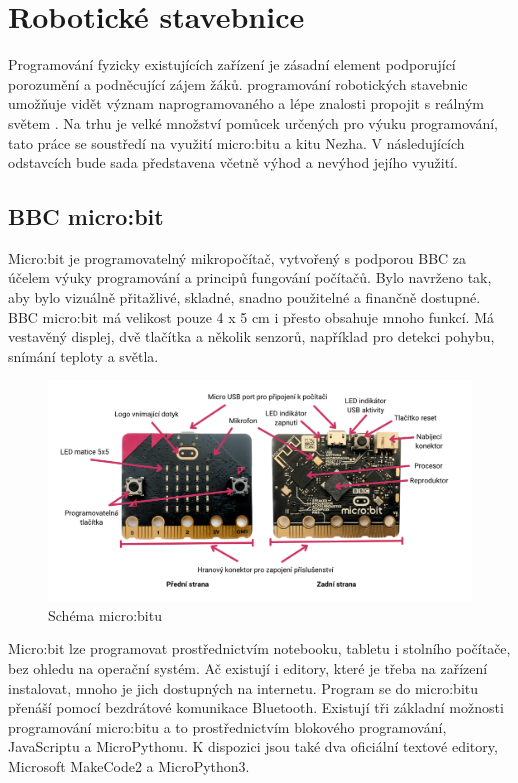 \documentclass[
  digital,     %
  oneside,     %
  nosansbold,  %
  colorbold, %
  lof,         %
  nolot,         %
]{fithesis4}
\begin{document}
\section{Robotické stavebnice}
Programování fyzicky existujících zařízení je zásadní element podporující porozumění a podněcující zájem žáků. programování robotických stavebnic umožňuje vidět význam naprogramovaného a lépe znalosti propojit s reálným světem \cite{Sentance17}. Na trhu je velké množství pomůcek určených pro výuku programování, tato práce se soustředí na využití micro:bitu a kitu Nezha.
V následujících odstavcích bude sada představena včetně výhod a nevýhod jejího využití. %

\subsection{BBC micro:bit}
Micro:bit je programovatelný mikropočítač, vytvořený s podporou BBC za účelem výuky programování a principů fungování počítačů. Bylo navrženo tak, aby bylo vizuálně přitažlivé, skladné, snadno použitelné a finančně dostupné. BBC micro:bit má velikost pouze 4 x 5 cm i přesto obsahuje mnoho funkcí.  Má vestavěný displej, dvě tlačítka a několik senzorů, například pro detekci pohybu, snímání teploty a světla. 

\begin{figure}
    \centering
    \includegraphics[width=\textwidth] {images/microbit.png}
    \caption{Schéma micro:bitu}
    \label{microbit}
\end{figure}

Micro:bit lze programovat prostřednictvím notebooku, tabletu i stolního počítače, bez ohledu na operační systém. Ač existují i editory, které je třeba na zařízení instalovat, mnoho je jich dostupných na internetu. Program se do micro:bitu přenáší pomocí bezdrátové komunikace Bluetooth. Existují tři základní možnosti programování micro:bitu a to prostřednictvím blokového programování, JavaScriptu a MicroPythonu. K dispozici jsou také dva oficiální textové editory, Microsoft MakeCode2 a MicroPython3.
\end{document}
